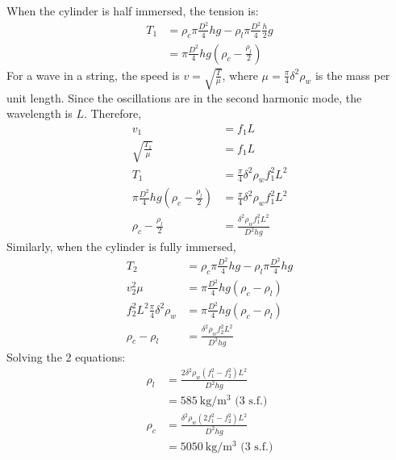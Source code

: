 \begin{solution}
\begin{subsolution}
        When the cylinder is half immersed, the tension is:
        \begin{align*}
            T_1&=\rho_c\pi \frac{D^2}{4} h g - \rho_l \pi \frac{D^2}{4} \frac{h}{2} g\\
            &=\pi \frac{D^2}{4}h g \left(\rho_c-\frac{\rho_l}{2}\right)
        \end{align*}
        For a wave in a string, the speed is \(v=\sqrt{\frac{T}{\mu}}\), where \(\mu=\frac{\pi}{4}\delta^2\rho_w\) is the mass per unit length. Since the oscillations are in the second harmonic mode, the wavelength is $L$. Therefore,
        \begin{align*}
            v_1&=f_1 L\\
            \sqrt{\frac{T_1}{\mu}}&= f_1 L\\
            T_1&=\frac{\pi}{4}\delta^2\rho_w f_1^2 L^2\\
            \pi \frac{D^2}{4} h g \left(\rho_c-\frac{\rho_l}{2}\right)&=\frac{\pi}{4}\delta^2\rho_w f_1^2 L^2\\
            \rho_c-\frac{\rho_l}{2}&=\frac{\delta^2\rho_w f_1^2 L^2}{D^2hg}
        \end{align*}
        Similarly, when the cylinder is fully immersed,
        \begin{align*}
            T_2&=\rho_c\pi \frac{D^2}{4} h g - \rho_l \pi \frac{D^2}{4} h g\\
            v_2^2 \mu &= \pi \frac{D^2}{4}h g \left(\rho_c-\rho_l\right)\\
            f_2^2L^2\frac{\pi}{4}\delta^2\rho_w &= \pi \frac{D^2}{4}h g \left(\rho_c-\rho_l\right)\\
            \rho_c-\rho_l&=\frac{\delta^2\rho_w f_2^2 L^2}{D^2hg}
        \end{align*}
        Solving the 2 equations:
        \begin{align*}
            \rho_l&=\frac{2\delta^2\rho_w \left(f_1^2-f_2^2\right) L^2}{D^2hg}\\
            &=\boxed{\qty{585}{\kg\per\cubic\m}}\text{ (3 s.f.)}\\
            \rho_c&=\frac{\delta^2\rho_w \left(2f_1^2-f_2^2\right)L^2}{D^2hg}\\
            &=\boxed{\qty{5050}{\kg\per\cubic\m}}\text{ (3 s.f.)}
        \end{align*}
    \end{subsolution}
\end{solution}

